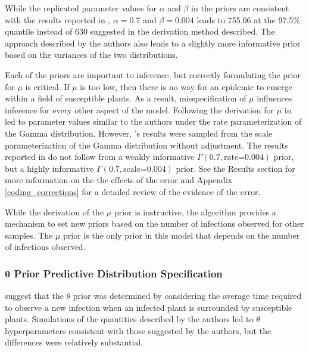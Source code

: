 \documentclass{uwstat572}
\begin{document}
While the replicated parameter values for $\alpha$ and $\beta$ in the priors are consistent with the results reported in \citep{Brown}, $\alpha=0.7$ and $\beta=0.004$ leads to 755.06 at the 97.5\% quantile instead of 630 suggested in the derivation method described. 
The approach described by the authors also leads to a slightly more informative prior based on the variances of the two distributions. 

Each of the priors are important to inference, but correctly formulating the prior for $\mu$ is critical. 
If $\mu$ is too low, then there is no way for an epidemic to emerge within a field of susceptible plants. 
As a result, misspecification of $\mu$ influences inference for every other aspect of the model. 
Following the derivation for $\mu$ in \citet{Brown} led to parameter values similar to the authors under the rate parameterization of the Gamma distribution. 
However, \citep{Brown}'s results were sampled from the scale parameterization of the Gamma distribution without adjustment.
The results reported in \citet{Brown} do not follow from a weakly informative $\Gamma(0.7, \text{rate=}0.004)$ prior, but a highly informative $\Gamma(0.7, \text{scale=}0.004)$ prior. 
See the Results section for more information on the the effects of the error and Appendix \ref{coding_corrections} for a detailed review of the evidence of the error.  

While the derivation of the $\mu$ prior is instructive, the algorithm provides a mechanism to set new priors based on the number of infections observed for other samples. 
The $\mu$ prior is the only prior in this model that depends on the number of infections observed. 

\subsubsection{$\boldsymbol{\theta}$ Prior Predictive Distribution Specification}
\citet{Brown} suggest that the $\theta$ prior was determined by considering the average time required to observe a new infection when an infected plant is surrounded by susceptible plants. 
Simulations of the quantities described by the authors led to $\theta$ hyperparameters consistent with those suggested by the authors, but the differences were relatively substantial.
\end{document}
